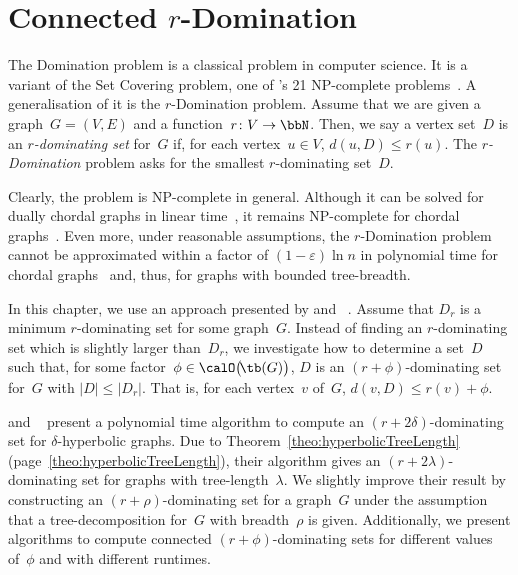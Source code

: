 \chapter{Connected $r$-Domination}
    \label{cha:conDomination}
%

\DeclareRobustCommand{\rHrt}
{%
    \ifmmode
        \text{\boldmath (\raisebox{-0.25ex}{$\heartsuit$})}~%
    \else%
        {\boldmath (\raisebox{-0.25ex}{$\heartsuit$})}\xspace%
    \fi%
}

\DeclareRobustCommand{\rDmd}
{%
    \ifmmode%
        \text{\boldmath ($\diamondsuit$)}~%
    \else%
        {\boldmath ($\diamondsuit$)}\xspace%
    \fi%
}

The Domination problem is a classical problem in computer science.
It is a variant of the Set Covering problem, one of 's 21 NP-complete problems~\cite{Karp1972}.
A generalisation of it is the $r$-Domination problem.
Assume that we are given a graph~$G = (V, E)$ and a function~$r \colon V \rightarrow \bbN$.
Then, we say a vertex set~$D$ is an \emph{\( r \)-dominating set} for~$G$ if, for each vertex~$u \in V$, $d(u, D) \leq r(u)$.
The \emph{\( r \)-Domination} problem asks for the smallest $r$-dominating set~$D$.

Clearly, the problem is NP-complete in general.
Although it can be solved for dually chordal graphs in linear time~\cite{BranChepDrag1998}, it remains NP-complete for chordal graphs~\cite{BoothJohnso1982}.
Even more, under reasonable assumptions, the $r$-Domination problem cannot be approximated within a factor of $(1-\varepsilon) \ln n$ in polynomial time for chordal graphs~\cite{ChlebiChlebi2008} and, thus, for graphs with bounded tree-breadth.

In this chapter, we use an approach presented by  and ~\cite{ChepoiEstell2007}.
Assume that $D_r$ is a minimum $r$-dominating set for some graph~$G$.
Instead of finding an $r$-dominating set which is slightly larger than~$D_r$,
we investigate how to determine a set~$D$ such that, for some factor~$\phi \in \calO \big( \! \tb(G) \big)$, $D$ is an $(r + \phi)$-dominating set for~$G$ with $|D| \leq |D_r|$.
That is, for each vertex~$v$ of~$G$, $d(v, D) \leq r(v) + \phi$.

 and ~\cite{ChepoiEstell2007} present a polynomial time algorithm to compute an $(r + 2 \delta)$-dominating set for $\delta$-hyperbolic graphs.
Due to Theorem~\ref{theo:hyperbolicTreeLength} (page~\ref{theo:hyperbolicTreeLength}), their algorithm gives an $(r + 2 \lambda)$-dominating set for graphs with tree-length~$\lambda$.
We slightly improve their result by constructing an $(r + \rho)$-dominating set for a graph~$G$ under the assumption that a tree-decomposition for~$G$ with breadth~$\rho$ is given.
Additionally, we present algorithms to compute connected $(r + \phi)$-dominating sets for different values of~$\phi$ and with different runtimes.

